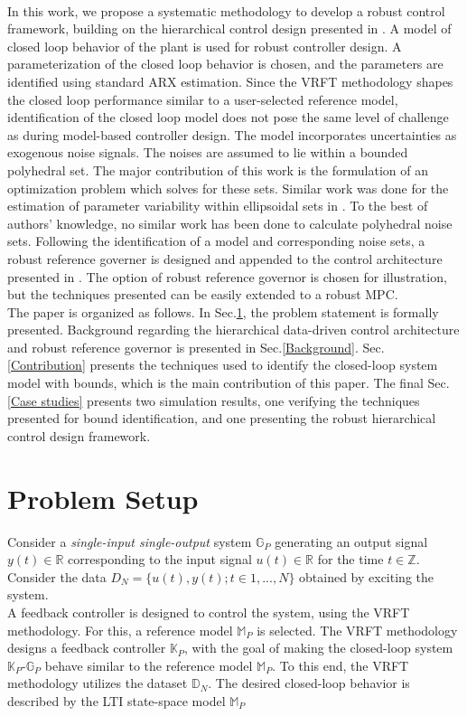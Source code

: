 \documentclass[letterpaper, 10 pt, conference]{ieeeconf}  %
\begin{document}
\\ \indent
In this work, we propose a systematic methodology to develop a robust control framework, building on the hierarchical control design presented in \cite{7932940}. A model of closed loop behavior of the plant is used for robust controller design. A parameterization of the closed loop behavior is chosen, and the parameters are identified using standard ARX estimation. Since the VRFT methodology shapes the closed loop performance similar to a user-selected reference model, identification of the closed loop model does not pose the same level of challenge as during model-based controller design.
 The model incorporates uncertainties as exogenous noise signals. The noises are assumed to lie within a bounded polyhedral set. The major contribution of this work is the formulation of an optimization problem which solves for these sets. Similar work was done for the estimation of parameter variability within ellipsoidal sets in \cite{7330793}. To the best of authors' knowledge, no similar work has been done to calculate polyhedral noise sets. Following the identification of a model and corresponding noise sets, a robust reference governer is designed and appended to the control architecture presented in \cite{7330793}.
 The option of robust reference governor is chosen for illustration, but the techniques presented can be easily extended to a robust MPC.
 \\ \indent
 The paper is organized as follows. In Sec.\ref{Problem statement}, the problem statement is formally presented. Background regarding the hierarchical data-driven control architecture and robust reference governor is presented in Sec.\ref{Background}. Sec.\ref{Contribution} presents the techniques used to identify the closed-loop system model with bounds, which is the main contribution of this paper. The final Sec.\ref{Case studies} presents two simulation results, one verifying the techniques presented for bound identification, and one presenting the robust hierarchical control design framework. 

\section{Problem Setup}
\label{Problem statement}
Consider a \textit{single-input single-output} system $\mathbb{G}_P$ generating an output signal $y(t) \in \mathbb{R}$ corresponding to the input signal $u(t) \in \mathbb{R}$ for the time $t \in \mathbb{Z}$. Consider the data $D_{N}=\{u(t),y(t);t\in{1,...,N}\}$ obtained by exciting the system. 
\\
A feedback controller is designed to control the system, using the VRFT methodology. For this, a reference model $\mathbb{M}_P$ is selected. The VRFT methodology designs a feedback controller  $\mathbb{K}_P$, with the goal of making the closed-loop system $\mathbb{K}_P$-$\mathbb{G}_P$ behave similar to the reference model $\mathbb{M}_P$. To this end, the VRFT methodology utilizes the dataset $\mathbb{D}_N$. The desired closed-loop behavior is described by the LTI state-space model $\mathbb{M}_P$ 
\end{document}
